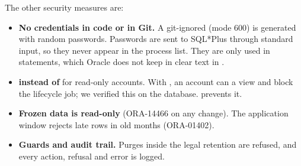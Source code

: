 The other security measures are:

\begin{itemize}
  \item \textbf{No credentials in code or in Git.} A git-ignored  (mode 600) is
        generated with random passwords. Passwords are sent to SQL*Plus through standard
        input, so they never appear in the process list. They are only used in
         statements, which Oracle does not keep in clear text in
        .
  \item \textbf{ instead of } for read-only accounts. With
        , an account can  a view and block the lifecycle job; we
        verified this on the database.  prevents it.
  \item \textbf{Frozen data is read-only} (ORA-14466 on any change). The application window
        rejects late rows in old months (ORA-01402).
  \item \textbf{Guards and audit trail.} Purges inside the legal retention are refused, and
        every action, refusal and error is logged.
\end{itemize}
